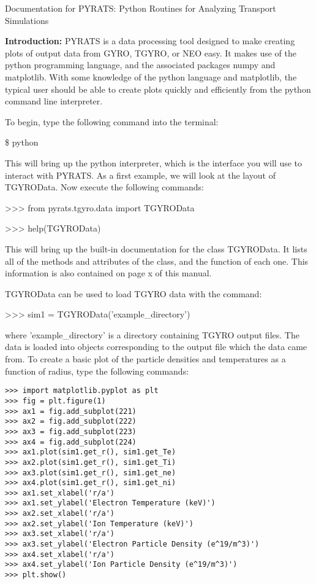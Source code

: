 \documentclass{article}
\begin{document}
\begin{center}
\Large
Documentation for PYRATS:
Python Routines for Analyzing Transport Simulations
\end{center}
\normalsize

\noindent \textbf{Introduction: }PYRATS is a data processing tool designed to make creating plots of output data from GYRO, TGYRO, or NEO easy.  It makes use of the python programming language, and the associated packages numpy and matplotlib.  With some knowledge of the python language and matplotlib, the typical user should be able to create plots quickly and efficiently from the python command line interpreter.

\noindent To begin, type the following command into the terminal:
\fontfamily{\ttdefault}\selectfont

\$ python

\fontfamily{\rmdefault}\selectfont
\noindent This will bring up the python interpreter, which is the interface you will use to interact with PYRATS.  As a first example, we will look at the layout of TGYROData.  Now execute the following commands:
\fontfamily{\ttdefault}\selectfont

>>> from pyrats.tgyro.data import TGYROData
\addtolength{\parskip}{-\baselineskip}

>>> help(TGYROData)

\addtolength{\parskip}{\baselineskip}
\fontfamily{\rmdefault}\selectfont
\noindent This will bring up the built-in documentation for the class TGYROData.  It lists all of the methods and attributes of the class, and the function of each one.  This information is also contained on page x of this manual.

\noindent TGYROData can be used to load TGYRO data with the command:
\fontfamily{\ttdefault}\selectfont

>>> sim1 = TGYROData('example\_directory')

\fontfamily{\rmdefault}\selectfont
\noindent where 'example\_directory' is a directory containing TGYRO output files.  The data is loaded into objects corresponding to the output file which the data came from.  To create a basic plot of the particle densities and temperatures as a function of radius, type the following commands:
\fontfamily{\ttdefault}\selectfont

\addtolength{\parskip}{-\baselineskip}

\begin{verbatim}
>>> import matplotlib.pyplot as plt
>>> fig = plt.figure(1)
>>> ax1 = fig.add_subplot(221)
>>> ax2 = fig.add_subplot(222)
>>> ax3 = fig.add_subplot(223)
>>> ax4 = fig.add_subplot(224)
>>> ax1.plot(sim1.get_r(), sim1.get_Te)
>>> ax2.plot(sim1.get_r(), sim1.get_Ti)
>>> ax3.plot(sim1.get_r(), sim1.get_ne)
>>> ax4.plot(sim1.get_r(), sim1.get_ni)
>>> ax1.set_xlabel('r/a')
>>> ax1.set_ylabel('Electron Temperature (keV)')
>>> ax2.set_xlabel('r/a')
>>> ax2.set_ylabel('Ion Temperature (keV)')
>>> ax3.set_xlabel('r/a')
>>> ax3.set_ylabel('Electron Particle Density (e^19/m^3)')
>>> ax4.set_xlabel('r/a')
>>> ax4.set_ylabel('Ion Particle Density (e^19/m^3)')
>>> plt.show()
\end{verbatim}
\end{document}

